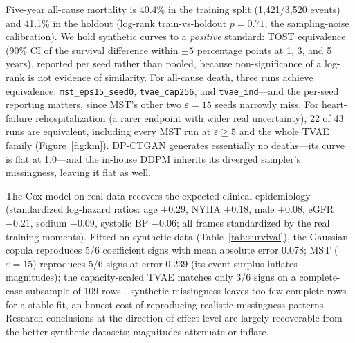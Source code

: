 \documentclass[11pt,a4paper]{article}
\newcommand{\eps}{\ensuremath{\varepsilon}}
\begin{document}
Five-year all-cause mortality is 40.4\% in the training split (1{,}421/3{,}520
events) and 41.1\% in the holdout (log-rank train-vs-holdout $p = 0.71$, the
sampling-noise calibration). We hold synthetic curves to a \emph{positive}
standard: TOST equivalence (90\% CI of the survival difference within $\pm 5$
percentage points at 1, 3, and 5 years), reported per seed rather than pooled,
because non-significance of a log-rank is not evidence of similarity. For
all-cause death, three runs achieve equivalence: \texttt{mst\_eps15\_seed0},
\texttt{tvae\_cap256}, and \texttt{tvae\_ind}---and the per-seed reporting
matters, since MST's other two $\eps{=}15$ seeds narrowly miss. For
heart-failure rehospitalization (a rarer endpoint with wider real uncertainty),
22 of 43 runs are equivalent, including every MST run at $\eps \geq 5$ and the
whole TVAE family (Figure~\ref{fig:km}). DP-CTGAN generates essentially no
deaths---its curve is flat at 1.0---and the in-house DDPM inherits its diverged
sampler's missingness, leaving it flat as well.

The Cox model on real data recovers the expected clinical epidemiology
(standardized log-hazard ratios: age $+0.29$, NYHA $+0.18$, male $+0.08$, eGFR
$-0.21$, sodium $-0.09$, systolic BP $-0.06$; all frames standardized by the real
training moments). Fitted on synthetic data (Table~\ref{tab:survival}), the
Gaussian copula reproduces 5/6 coefficient signs with mean absolute error 0.078;
MST ($\eps{=}15$) reproduces 5/6 signs at error 0.239 (its event surplus inflates
magnitudes); the capacity-scaled TVAE matches only 3/6 signs on a complete-case
subsample of 109 rows---synthetic missingness leaves too few complete rows for a
stable fit, an honest cost of reproducing realistic missingness patterns.
Research conclusions at the direction-of-effect level are largely recoverable
from the better synthetic datasets; magnitudes attenuate or inflate.
\end{document}
